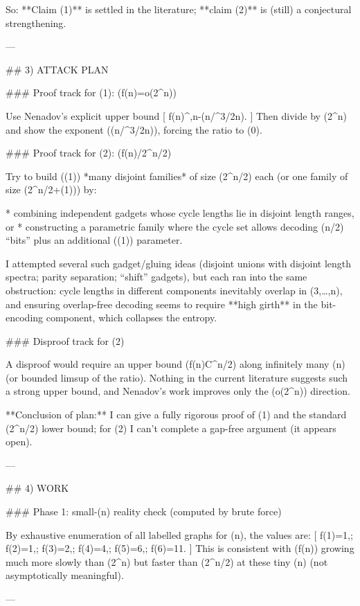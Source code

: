 So: **Claim (1)** is settled in the literature; **claim (2)** is (still) a conjectural strengthening.

---

## 3) ATTACK PLAN

### Proof track for (1): (f(n)=o(2^n))

Use Nenadov’s explicit upper bound
[
f(n)^{,n-\Omega(\sqrt n/\log^{3/2}n)}.
]
Then divide by (2^n) and show the exponent (\Omega(\sqrt n/\log^{3/2}n)\to\infty), forcing the ratio to (0).

### Proof track for (2): (f(n)/2^{n/2}\to\infty)

Try to build (\omega(1)) *many disjoint families* of size (2^{n/2}) each (or one family of size (2^{n/2+\omega(1)})) by:

* combining independent gadgets whose cycle lengths lie in disjoint length ranges, or
* constructing a parametric family where the cycle set allows decoding (n/2) “bits” plus an additional (\omega(1)) parameter.

I attempted several such gadget/gluing ideas (disjoint unions with disjoint length spectra; parity separation; “shift” gadgets), but each ran into the same obstruction: cycle lengths in different components inevitably overlap in ({3,\dots,n}), and ensuring overlap-free decoding seems to require **high girth** in the bit-encoding component, which collapses the entropy.

### Disproof track for (2)

A disproof would require an upper bound (f(n)\le C^{n/2}) along infinitely many (n) (or bounded limsup of the ratio). Nothing in the current literature suggests such a strong upper bound, and Nenadov’s work improves only the (o(2^n)) direction.

**Conclusion of plan:** I can give a fully rigorous proof of (1) and the standard (2^{n/2}) lower bound; for (2) I can’t complete a gap-free argument (it appears open).

---

## 4) WORK

### Phase 1: small-(n) reality check (computed by brute force)

By exhaustive enumeration of all labelled graphs for (n), the values are:
[
f(1)=1,; f(2)=1,; f(3)=2,; f(4)=4,; f(5)=6,; f(6)=11.
]
This is consistent with (f(n)) growing much more slowly than (2^n) but faster than (2^{n/2}) at these tiny (n) (not asymptotically meaningful).

---


